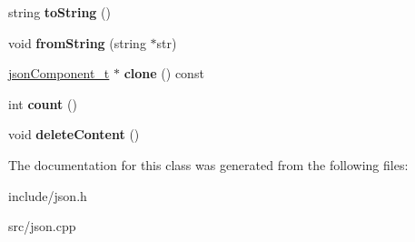 \begin{DoxyCompactItemize}
\item 
\hypertarget{classjsonObj__t_a7e8f833e1148d60f2e3cd8d825661a64}{string {\bfseries to\-String} ()}\label{classjsonObj__t_a7e8f833e1148d60f2e3cd8d825661a64}

\item 
\hypertarget{classjsonObj__t_a8883d95861bc93d0027fa3111243e980}{void {\bfseries from\-String} (string $\ast$str)}\label{classjsonObj__t_a8883d95861bc93d0027fa3111243e980}

\item 
\hypertarget{classjsonObj__t_a34646479f575729a7d3f93230b5dda55}{\hyperlink{classjsonComponent__t}{json\-Component\-\_\-t} $\ast$ {\bfseries clone} () const }\label{classjsonObj__t_a34646479f575729a7d3f93230b5dda55}

\item 
\hypertarget{classjsonObj__t_a27e4c21ea40f3e76d9c6e6987f20aa26}{int {\bfseries count} ()}\label{classjsonObj__t_a27e4c21ea40f3e76d9c6e6987f20aa26}

\item 
\hypertarget{classjsonObj__t_af36d0f1616a439ecc8583b6bf891570f}{void {\bfseries delete\-Content} ()}\label{classjsonObj__t_af36d0f1616a439ecc8583b6bf891570f}

\end{DoxyCompactItemize}


\-The documentation for this class was generated from the following files\-:\begin{DoxyCompactItemize}
\item 
include/json.\-h\item 
src/json.\-cpp\end{DoxyCompactItemize}

